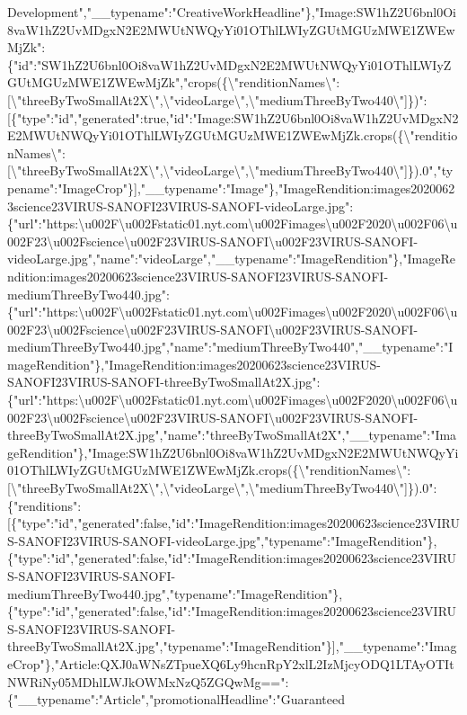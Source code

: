 Development","\_\_typename":"CreativeWorkHeadline"\},"Image:SW1hZ2U6bnl0Oi8vaW1hZ2UvMDgxN2E2MWUtNWQyYi01OThlLWIyZGUtMGUzMWE1ZWEwMjZk":\{"id":"SW1hZ2U6bnl0Oi8vaW1hZ2UvMDgxN2E2MWUtNWQyYi01OThlLWIyZGUtMGUzMWE1ZWEwMjZk","crops(\{\textbackslash{}"renditionNames\textbackslash{}":{[}\textbackslash{}"threeByTwoSmallAt2X\textbackslash{}",\textbackslash{}"videoLarge\textbackslash{}",\textbackslash{}"mediumThreeByTwo440\textbackslash{}"{]}\})":{[}\{"type":"id","generated":true,"id":"Image:SW1hZ2U6bnl0Oi8vaW1hZ2UvMDgxN2E2MWUtNWQyYi01OThlLWIyZGUtMGUzMWE1ZWEwMjZk.crops(\{\textbackslash{}"renditionNames\textbackslash{}":{[}\textbackslash{}"threeByTwoSmallAt2X\textbackslash{}",\textbackslash{}"videoLarge\textbackslash{}",\textbackslash{}"mediumThreeByTwo440\textbackslash{}"{]}\}).0","typename":"ImageCrop"\}{]},"\_\_typename":"Image"\},"ImageRendition:images20200623science23VIRUS-SANOFI23VIRUS-SANOFI-videoLarge.jpg":\{"url":"https:\textbackslash{}u002F\textbackslash{}u002Fstatic01.nyt.com\textbackslash{}u002Fimages\textbackslash{}u002F2020\textbackslash{}u002F06\textbackslash{}u002F23\textbackslash{}u002Fscience\textbackslash{}u002F23VIRUS-SANOFI\textbackslash{}u002F23VIRUS-SANOFI-videoLarge.jpg","name":"videoLarge","\_\_typename":"ImageRendition"\},"ImageRendition:images20200623science23VIRUS-SANOFI23VIRUS-SANOFI-mediumThreeByTwo440.jpg":\{"url":"https:\textbackslash{}u002F\textbackslash{}u002Fstatic01.nyt.com\textbackslash{}u002Fimages\textbackslash{}u002F2020\textbackslash{}u002F06\textbackslash{}u002F23\textbackslash{}u002Fscience\textbackslash{}u002F23VIRUS-SANOFI\textbackslash{}u002F23VIRUS-SANOFI-mediumThreeByTwo440.jpg","name":"mediumThreeByTwo440","\_\_typename":"ImageRendition"\},"ImageRendition:images20200623science23VIRUS-SANOFI23VIRUS-SANOFI-threeByTwoSmallAt2X.jpg":\{"url":"https:\textbackslash{}u002F\textbackslash{}u002Fstatic01.nyt.com\textbackslash{}u002Fimages\textbackslash{}u002F2020\textbackslash{}u002F06\textbackslash{}u002F23\textbackslash{}u002Fscience\textbackslash{}u002F23VIRUS-SANOFI\textbackslash{}u002F23VIRUS-SANOFI-threeByTwoSmallAt2X.jpg","name":"threeByTwoSmallAt2X","\_\_typename":"ImageRendition"\},"Image:SW1hZ2U6bnl0Oi8vaW1hZ2UvMDgxN2E2MWUtNWQyYi01OThlLWIyZGUtMGUzMWE1ZWEwMjZk.crops(\{\textbackslash{}"renditionNames\textbackslash{}":{[}\textbackslash{}"threeByTwoSmallAt2X\textbackslash{}",\textbackslash{}"videoLarge\textbackslash{}",\textbackslash{}"mediumThreeByTwo440\textbackslash{}"{]}\}).0":\{"renditions":{[}\{"type":"id","generated":false,"id":"ImageRendition:images20200623science23VIRUS-SANOFI23VIRUS-SANOFI-videoLarge.jpg","typename":"ImageRendition"\},\{"type":"id","generated":false,"id":"ImageRendition:images20200623science23VIRUS-SANOFI23VIRUS-SANOFI-mediumThreeByTwo440.jpg","typename":"ImageRendition"\},\{"type":"id","generated":false,"id":"ImageRendition:images20200623science23VIRUS-SANOFI23VIRUS-SANOFI-threeByTwoSmallAt2X.jpg","typename":"ImageRendition"\}{]},"\_\_typename":"ImageCrop"\},"Article:QXJ0aWNsZTpueXQ6Ly9hcnRpY2xlL2IzMjcyODQ1LTAyOTItNWRiNy05MDhlLWJkOWMxNzQ5ZGQwMg==":\{"\_\_typename":"Article","promotionalHeadline":"Guaranteed
